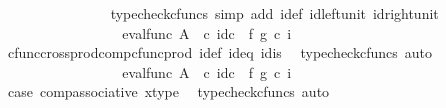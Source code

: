 \begin{isabellebody}
\ \ \ \ \ \ \ \ \ \ \ \ \ \ \isamarkupfalse%
\ {\isacharparenleft}{\kern0pt}typecheck{\isacharunderscore}{\kern0pt}cfuncs{\isacharcomma}{\kern0pt}\ simp\ add{\isacharcolon}{\kern0pt}\ i{\isacharunderscore}{\kern0pt}def\ id{\isacharunderscore}{\kern0pt}left{\isacharunderscore}{\kern0pt}unit{}\ id{\isacharunderscore}{\kern0pt}right{\isacharunderscore}{\kern0pt}unit{}{\isacharparenright}{\kern0pt}\isanewline
\ \ \ \ \ \ \ \ \ \ \ \ \isamarkupfalse%
\ \isamarkupfalse%
\ {\isachardoublequoteopen}{\isachardot}{\kern0pt}{\isachardot}{\kern0pt}{\isachardot}{\kern0pt}\ {\isacharequal}{\kern0pt}\ eval{\isacharunderscore}{\kern0pt}func\ A\ {\isasymOmega}\ {\isasymcirc}\isactrlsub c\ {\isacharparenleft}{\kern0pt}{\isacharparenleft}{\kern0pt}id\isactrlsub c\ {\isasymOmega}\ {\isasymtimes}\isactrlsub f\ g{\isacharparenright}{\kern0pt}\ {\isasymcirc}\isactrlsub c\ {\isasymlangle}{\isasymf}{\isacharcomma}{\kern0pt}i{\isasymrangle}{\isacharparenright}{\kern0pt}{\isachardoublequoteclose}\isanewline
\ \ \ \ \ \ \ \ \ \ \ \ \ \ \isamarkupfalse%
\ cfunc{\isacharunderscore}{\kern0pt}cross{\isacharunderscore}{\kern0pt}prod{\isacharunderscore}{\kern0pt}comp{\isacharunderscore}{\kern0pt}cfunc{\isacharunderscore}{\kern0pt}prod\ i{\isacharunderscore}{\kern0pt}def\ id{}{\isacharunderscore}{\kern0pt}eq\ id{}{\isacharunderscore}{\kern0pt}is\ \isamarkupfalse%
\ {\isacharparenleft}{\kern0pt}typecheck{\isacharunderscore}{\kern0pt}cfuncs{\isacharcomma}{\kern0pt}\ auto{\isacharparenright}{\kern0pt}\isanewline
\ \ \ \ \ \ \ \ \ \ \ \ \isamarkupfalse%
\ \isamarkupfalse%
\ {\isachardoublequoteopen}{\isachardot}{\kern0pt}{\isachardot}{\kern0pt}{\isachardot}{\kern0pt}\ {\isacharequal}{\kern0pt}\ {\isacharparenleft}{\kern0pt}eval{\isacharunderscore}{\kern0pt}func\ A\ {\isasymOmega}\ {\isasymcirc}\isactrlsub c\ {\isacharparenleft}{\kern0pt}id\isactrlsub c\ {\isasymOmega}\ {\isasymtimes}\isactrlsub f\ g{\isacharparenright}{\kern0pt}{\isacharparenright}{\kern0pt}\ {\isasymcirc}\isactrlsub c\ {\isasymlangle}{\isasymf}{\isacharcomma}{\kern0pt}i{\isasymrangle}{\isachardoublequoteclose}\isanewline
\ \ \ \ \ \ \ \ \ \ \ \ \ \ \isamarkupfalse%
\ case{}\ comp{\isacharunderscore}{\kern0pt}associative{}\ x{\isacharunderscore}{\kern0pt}type\ \isamarkupfalse%
\ {\isacharparenleft}{\kern0pt}typecheck{\isacharunderscore}{\kern0pt}cfuncs{\isacharcomma}{\kern0pt}\ auto{\isacharparenright}{\kern0pt}\isanewline

\end{isabellebody}
